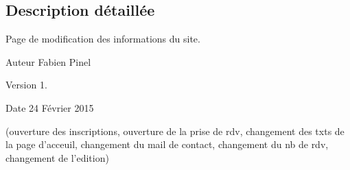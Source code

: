 \subsection{Description détaillée}
Page de modification des informations du site. \begin{DoxyAuthor}{Auteur}
Fabien Pinel 
\end{DoxyAuthor}
\begin{DoxyVersion}{Version}
1. 
\end{DoxyVersion}
\begin{DoxyDate}{Date}
24 Février 2015
\end{DoxyDate}
(ouverture des inscriptions, ouverture de la prise de rdv, changement des txts de la page d'acceuil, changement du mail de contact, changement du nb de rdv, changement de l'edition) 
